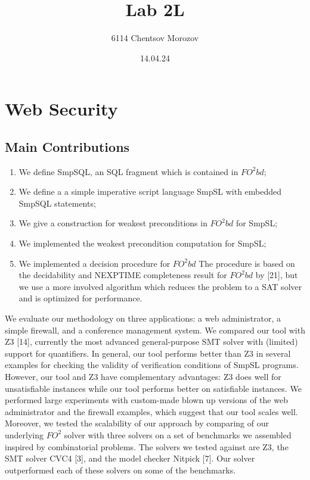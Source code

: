 \documentclass[12pt]{acmart}
\begin{document}
\begin{titlepage}
\title{Lab 2L}
\author{6114 Chentsov Morozov}
\date{14.04.24}
\maketitle
\thispagestyle{empty}
\end{titlepage}


\tableofcontents
\newpage


\section{Web Security}

\subsection{Main Contributions}

\begin{enumerate}
    \item We define SmpSQL, an SQL fragment which is contained in $FO^2bd$;
    \item We define a a simple imperative script language SmpSL with embedded SmpSQL statements;
    \item We give a construction for weakest preconditions in $FO^2bd$ for SmpSL;
    \item We implemented the weakest precondition computation for SmpSL;
    \item We implemented a decision procedure for $FO^2bd$ The procedure is based on the decidability and NEXPTIME completeness result for $FO^2bd$ by [21], but we use a more involved algorithm which reduces the problem to a SAT solver and is optimized for performance.
\end{enumerate}

We evaluate our methodology on three applications: a web administrator, a simple firewall, and a conference management system. We compared our tool with Z3 [14], currently the most advanced general-purpose SMT solver with (limited) support for quantifiers. In general, our tool performs better than Z3 in several examples for checking the validity of verification conditions of SmpSL programs. However, our tool and Z3 have complementary advantages: Z3 does well for unsatisfiable instances while our tool performs better on satisfiable instances. We performed large experiments with custom-made blown up versions of the web administrator and the firewall examples, which suggest that our tool scales well. Moreover, we tested the scalability of our approach by comparing of our underlying $FO^2$ solver with three solvers on a set of benchmarks we assembled inspired by combinatorial problems. The solvers we tested against are Z3, the SMT solver CVC4 [3], and the model checker Nitpick [7]. Our solver outperformed each of these solvers on some of the benchmarks.
\end{document}
